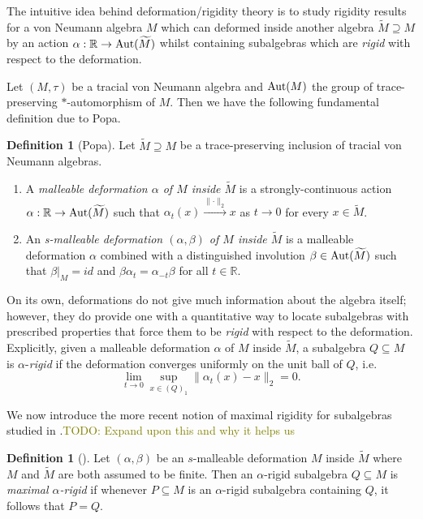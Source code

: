 \documentclass[a4paper,11pt]{article}
\numberwithin{equation}{section}
\theoremstyle{definition}
\newtheorem{defn}[thm]{Definition}
\theoremstyle{remark}
\numberwithin{equation}{section}
\def\R{\mathbb{R}}
\newcommand{\Aut}{{\rm Aut}}
\def\sub{\subseteq}
\providecommand{\norm}[1]{\lVert#1\rVert}
\numberwithin{equation}{section}
\begin{document}
The intuitive idea behind deformation/rigidity theory is to study rigidity results for a von Neumann algebra $ M $ which can deformed inside another algebra $ \widetilde{M}\supseteq M $ by an action $ \alpha: \R \to \Aut(\widetilde{M}) $ whilst containing subalgebras which are \textit{rigid} with respect to the deformation.

Let $ (M,\tau) $ be a tracial von Neumann algebra and $ \Aut(M) $ the group of trace-preserving $ * $-automorphism of $ M $. Then we have the following fundamental definition due to Popa.

\begin{defn}[Popa]
  Let $ \widetilde{M}\supseteq M $ be a trace-preserving inclusion of tracial von Neumann algebras.
  \begin{enumerate}
    \item A \textit{malleable deformation $ \alpha $ of $ M $ inside $ \widetilde{M} $} is a strongly-continuous action $ \alpha:\R\to \Aut(\widetilde{M}) $ such that $ \alpha_{t}(x)\xrightarrow{\norm{\cdot}_{2}}x $ as $ t\to 0 $ for every $ x\in \widetilde{M} $.
    \item An \textit{s-malleable deformation $ (\alpha,\beta) $ of $ M $ inside $ \widetilde{M} $ } is a malleable deformation $ \alpha $ combined with a distinguished involution $ \beta\in\Aut(\widetilde{M}) $ such that $ \beta\vert_{M} = id $ and $ \beta \alpha_{t} = \alpha_{-t} \beta $ for all $ t\in \R $.
  \end{enumerate}
\end{defn}


On its own, deformations do not give much information about the algebra itself; however, they do provide one with a quantitative way to locate subalgebras with prescribed properties that force them to be \textit{rigid} with respect to the deformation. Explicitly, given a malleable deformation $ \alpha $ of $ M $ inside $ \widetilde{M} $, a subalgebra $ Q\sub M $ is $ \alpha $-\textit{rigid} if the deformation converges uniformly on the unit ball of $ Q $, i.e.
$$
  \lim_{t\to 0}\sup_{x\in (Q)_{1}} \norm{\alpha_{t}(x)-x}_{2} =0.
$$

We now introduce the more recent notion of maximal rigidity for subalgebras studied in \cite{dSHH:21}.\textcolor{olive}{TODO: Expand upon this and why it helps us}

\begin{defn}[\textcite{dSHH:21}]
  Let $ (\alpha,\beta) $ be an $ s $-malleable deformation $ M $ inside $ \widetilde{M} $ where $ M $ and $ \widetilde{M} $ are both assumed to be finite. Then an $ \alpha $-rigid subalgebra $ Q\sub M $ is \textit{maximal $ \alpha $-rigid} if whenever $ P\sub M $ is an $ \alpha $-rigid subalgebra containing $ Q $, it follows that $ P = Q $.
\end{defn}
\end{document}
